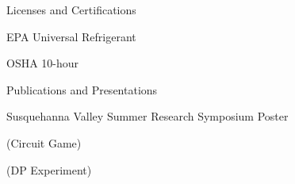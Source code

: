 \documentclass{resume} %
\newcommand{\tab}[1]{\hspace{.2667\textwidth}\rlap{#1}}
\newcommand{\itab}[1]{\hspace{0em}\rlap{#1}}
\begin{document}

\begin{rSection}{Licenses and Certifications} \itemsep -2pt
\item EPA Universal Refrigerant
\item OSHA 10-hour

\end{rSection}


\begin{rSection}{Publications and Presentations} \itemsep -2pt
\item Susquehanna Valley Summer Research Symposium Poster
\item (Circuit Game)
\item (DP Experiment)

\end{rSection}

\iffalse
\begin{rSection}{Relevant Courses}
\itab{\textbf{Core Courses}} \tab{}  \tab{\textbf{Other Courses}}
\\ \itab{Discrete Structures} \tab{}  \tab{Computer Organization \& Programming}
\\ \itab{Calculus III} \tab{}  \tab{Operating Systems} 
\\ \itab{Algorithms} \tab{}  \tab{Logic} 
\\ \itab{Life, Computers \& Everything} \tab{} \tab{Linear Algebra}
\\ \itab{Software Engineering and Design} \tab{} \tab{Cognitive Science (Audit)}

\end{rSection}
\fi
\end{document}
